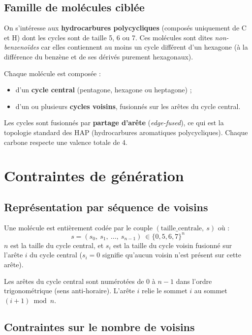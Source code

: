 \documentclass[a4paper,12pt]{article}
\begin{document}
\subsection{Famille de molécules ciblée}

On s'intéresse aux \textbf{hydrocarbures polycycliques} (composés uniquement de C et H) dont les
cycles sont de taille 5, 6 ou 7. Ces molécules sont dites \textit{non-benzenoïdes} car elles
contiennent au moins un cycle différent d'un hexagone (à la différence du benzène et de ses
dérivés purement hexagonaux).

Chaque molécule est composée :
\begin{itemize}
  \item d'un \textbf{cycle central} (pentagone, hexagone ou heptagone) ;
  \item d'un ou plusieurs \textbf{cycles voisins}, fusionnés sur les arêtes du cycle central.
\end{itemize}

Les cycles sont fusionnés par \textbf{partage d'arête} (\textit{edge-fused}), ce qui est la
topologie standard des HAP (hydrocarbures aromatiques polycycliques). Chaque carbone respecte une
valence totale de 4.

\section{Contraintes de génération}

\subsection{Représentation par séquence de voisins}

Une molécule est entièrement codée par le couple $(\text{taille\_centrale},\ s)$ où :
\[
  s = (s_0,\ s_1,\ \ldots,\ s_{n-1})\ \in \{0, 5, 6, 7\}^n
\]
$n$ est la taille du cycle central, et $s_i$ est la taille du cycle voisin fusionné sur l'arête
$i$ du cycle central ($s_i = 0$ signifie qu'aucun voisin n'est présent sur cette arête).

\begin{remarque}
  Les arêtes du cycle central sont numérotées de 0 à $n-1$ dans l'ordre trigonométrique
  (sens anti-horaire). L'arête $i$ relie le sommet $i$ au sommet $(i+1) \bmod n$.
\end{remarque}

\subsection{Contraintes sur le nombre de voisins}
\end{document}
